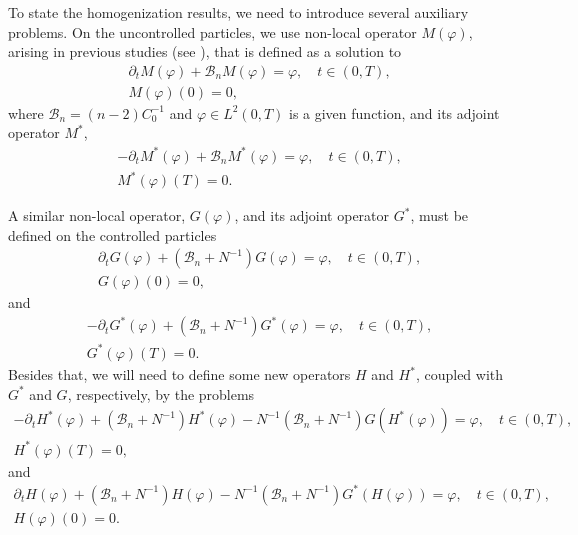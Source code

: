 \documentclass[reqno]{amsart}
\begin{document}
To state the homogenization results, we need to introduce several auxiliary
problems. On the uncontrolled particles, we use non-local operator
$M(\varphi )$, arising in previous studies (see \cite{DiPoShAttouch}), that
is defined as a solution to
\begin{equation}
\begin{gathered}
\partial _{t}M(\varphi )+\mathcal{B}_nM(\varphi )=\varphi , \quad t\in (0,T), \\
M(\varphi )(0)=0,
\end{gathered}
\end{equation}
where $\mathcal{B}_n=(n-2)C_0^{-1}$ and $\varphi \in L^2(0,T)$ is a
given function, and its adjoint operator $M^{\ast }$,
\begin{equation}
\begin{gathered}
-\partial _{t}M^{\ast }(\varphi )+\mathcal{B}_nM^{\ast }(\varphi )
=\varphi, \quad t\in (0,T), \\
M^{\ast }(\varphi )(T)=0.
\end{gathered}
\end{equation}

A similar non-local operator, $G(\varphi )$, and its adjoint operator
$G^{\ast }$, must be defined on the controlled particles
\begin{equation}
\begin{gathered}
\partial _{t}G(\varphi )+(\mathcal{B}_n+N^{-1})G(\varphi )=\varphi , \quad
t\in (0,T), \\
G(\varphi )(0)=0,
\end{gathered}  \label{G prob}
\end{equation}
and
\begin{equation}
\begin{gathered}
-\partial _{t}G^{\ast }(\varphi )+(\mathcal{B}_n+N^{-1})G^{\ast }(\varphi
)=\varphi , \quad t\in (0,T), \\
G^{\ast }(\varphi )(T)=0. 
\end{gathered}  \label{adj G prob}
\end{equation}
Besides that, we will need to define some new operators $H$ and $H^{\ast }$,
coupled with $G^{\ast }$ and $G$, respectively, by the problems
\begin{equation}
\begin{gathered}
-\partial _{t}H^{\ast }(\varphi )+(\mathcal{B}_n+N^{-1})H^{\ast }(\varphi
)-N^{-1}(\mathcal{B}_n+N^{-1})G(H^{\ast }(\varphi ))=\varphi , \quad
 t\in (0,T), \\
H^{\ast }(\varphi )(T)=0, 
\end{gathered} \label{H*eq}
\end{equation}
and
\begin{equation}
\begin{gathered}
\partial _{t}H(\varphi )+(\mathcal{B}_n+N^{-1})H(\varphi )
-N^{-1}(\mathcal{B}_n+N^{-1})G^{\ast }(H(\varphi ))=\varphi , \quad t\in (0,T), \\
H(\varphi )(0)=0. 
\end{gathered}  \label{eqH}
\end{equation}
\end{document}

